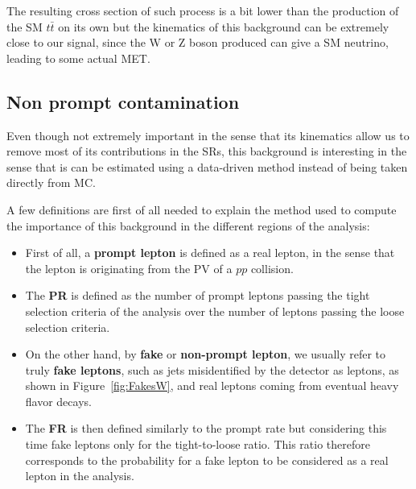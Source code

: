 \documentclass[a4paper, 10pt, openright]{report}
\begin{document}
The resulting cross section of such process is a bit lower than the production of the \ac{SM} $t \bar t$ on its own but the kinematics of this background can be extremely close to our signal, since the W or Z boson produced can give a \ac{SM} neutrino, leading to some actual \ac{MET}.

\subsection{Non prompt contamination} \label{subsection:Fakes}

Even though not extremely important in the sense that its kinematics allow us to remove most of its contributions in the \acp{SR}, this background is interesting in the sense that is can be estimated using a data-driven method instead of being taken directly from \ac{MC}.

A few definitions are first of all needed to explain the method used to compute the importance of this background in the different regions of the analysis:
\begin{itemize}
\item First of all, a \textbf{prompt lepton} is defined as a real lepton, in the sense that the lepton is originating from the \ac{PV} of a $pp$ collision.
\item The \textbf{\ac{PR}} is defined as the number of prompt leptons passing the tight selection criteria of the analysis over the number of leptons passing the loose selection criteria. 
\item On the other hand, by \textbf{fake} or \textbf{non-prompt lepton}, we usually refer to truly \textbf{fake leptons}, such as jets misidentified by the detector as leptons, as shown in Figure~\ref{fig:FakesW}, and real leptons coming from eventual heavy flavor decays.
\item The \textbf{\ac{FR}} is then defined similarly to the prompt rate but considering this time fake leptons only for the tight-to-loose ratio. This ratio therefore corresponds to the probability for a fake lepton to be considered as a real lepton in the analysis.
\end{itemize}
\end{document}
